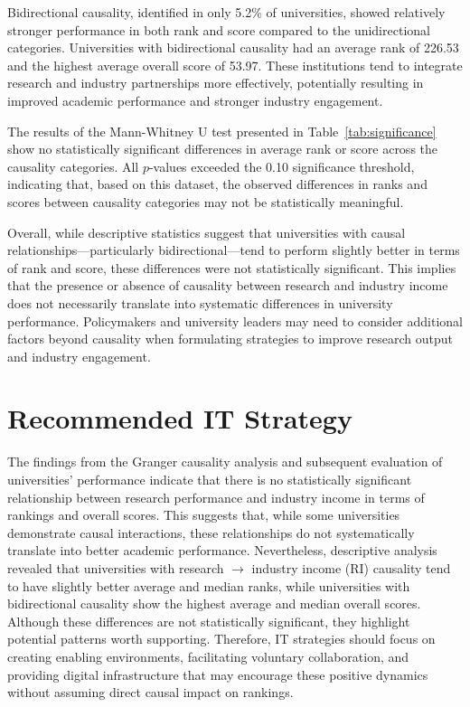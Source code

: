 \documentclass[a4paper, conference]{IEEEtran}
\begin{document}
Bidirectional causality, identified in only 5.2\% of universities, showed relatively stronger performance in both rank and score compared to the unidirectional categories. Universities with bidirectional causality had an average rank of 226.53 and the highest average overall score of 53.97. These institutions tend to integrate research and industry partnerships more effectively, potentially resulting in improved academic performance and stronger industry engagement.

The results of the Mann-Whitney U test presented in Table~\ref{tab:significance} show no statistically significant differences in average rank or score across the causality categories. All $p$-values exceeded the 0.10 significance threshold, indicating that, based on this dataset, the observed differences in ranks and scores between causality categories may not be statistically meaningful.

Overall, while descriptive statistics suggest that universities with causal relationships—particularly bidirectional—tend to perform slightly better in terms of rank and score, these differences were not statistically significant. This implies that the presence or absence of causality between research and industry income does not necessarily translate into systematic differences in university performance. Policymakers and university leaders may need to consider additional factors beyond causality when formulating strategies to improve research output and industry engagement.


\section{Recommended IT Strategy}
\label{sec:recommended_it_strategy}

The findings from the Granger causality analysis and subsequent evaluation of universities' performance indicate that there is no statistically significant relationship between research performance and industry income in terms of rankings and overall scores. This suggests that, while some universities demonstrate causal interactions, these relationships do not systematically translate into better academic performance. Nevertheless, descriptive analysis revealed that universities with research $\rightarrow$ industry income (RI) causality tend to have slightly better average and median ranks, while universities with bidirectional causality show the highest average and median overall scores. Although these differences are not statistically significant, they highlight potential patterns worth supporting. Therefore, IT strategies should focus on creating enabling environments, facilitating voluntary collaboration, and providing digital infrastructure that may encourage these positive dynamics without assuming direct causal impact on rankings.
\end{document}
